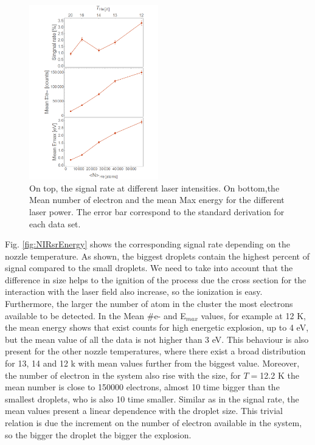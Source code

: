  \begin{figure}[h!]
\centering
\includegraphics[width=0.5\textwidth]{../Images/results/NI_He_Dropletsize/Alltogether.png} 
\caption[NIR He intensity dependence. Signal Rate and Mean Values)]{On top, the signal rate at different laser intensities. On bottom,the Mean number of electron and the mean Max energy for the different laser power. The error bar correspond to the standard derivation for each data set.}
\label{fig:NIRHEall}
\end{figure}

Fig. \ref{fig:NIRsrEnergy} shows the corresponding signal rate depending on the nozzle temperature. As shown, the biggest droplets contain the highest percent of signal compared to the small droplets. We need to take into account that the difference in size helps to the ignition of the process due the cross section for the interaction with the laser field also increase, so the ionization is easy. Furthermore, the larger the number of atom in the cluster the most electrons available to be detected. In the Mean $\#$e- and E$_{max}$ values, for example at 12 K, the mean energy shows that exist counts for high energetic explosion, up to 4 eV, but the mean value of all the data is not higher than 3 eV. This behaviour is also present for the other nozzle temperatures, where there exist a broad distribution for 13, 14 and 12 k with mean values further from the biggest value.
Moreover, the number of electron in the system also rise with the size, for $T=$12.2 K the mean number is close to 150000 electrons, almost 10 time bigger than the smallest droplets, who is also 10 time smaller. Similar as in the signal rate, the mean values present a linear dependence with the droplet size. This trivial relation is due the increment on the number of electron available in the system, so the bigger the droplet the bigger the explosion. 

